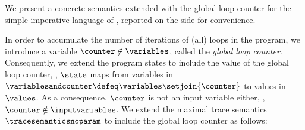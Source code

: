 We present a concrete semantics extended with the global loop counter for the simple imperative language of , reported on the side for convenience.




In order to accumulate the number of iterations of (all) loops in the program, we introduce a variable $\counter\not\in\variables$, called the \emph{global loop counter}.
Consequently, we extend the program states to include the value of the global loop counter, \ie, $\state$ maps from variables in $\variablesandcounter\defeq\variables\setjoin\{\counter\}$ to values in $\values$.
As a consequence, $\counter$ is not an input variable either, \ie, $\counter\notin\inputvariables$.
We extend the maximal trace semantics $\tracesemanticsnoparam$ to include the global loop counter as follows:

